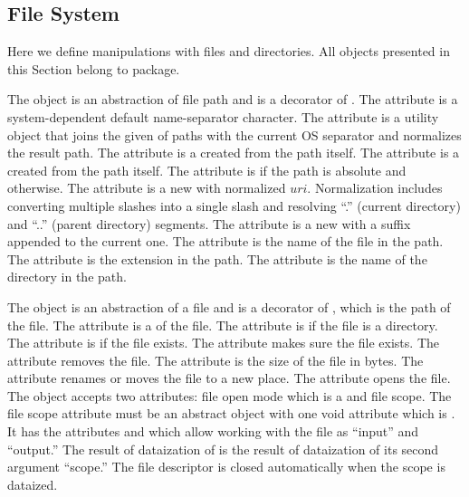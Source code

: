 
\subsection{File System}\label{sec:fs}

Here we define manipulations with files and directories.
All objects presented in this Section belong to  package.

The object  is an abstraction of file path and is a decorator of .
%
The attribute  is a system-dependent default name-separator character.
%
The attribute  is a utility object that joins the given 
  of paths with the current OS separator and normalizes the result path.
%
The attribute  is a  created from the path itself.
%
The attribute  is a  created from the path itself.
%
The attribute  is  if the path is absolute and  otherwise.
%
The attribute  is a new  with normalized \(uri\).
Normalization includes converting multiple slashes into a single slash
  and resolving ``.'' (current directory) and ``..'' (parent directory) segments.
%
The attribute  is a new  with a suffix appended to the current one.
%
The attribute  is the name of the file in the path.
%
The attribute  is the extension in the path.
%
The attribute  is the name of the directory in the path.

The object  is an abstraction of a file and is a decorator of ,
  which is the path of the file.
%
The attribute  is a  of the file.
%
The attribute  is  if the file is a directory.
%
The attribute  is  if the file exists.
%
The attribute  makes sure the file exists.
%
The attribute  removes the file.
%
The attribute  is the size of the file in bytes.
%
The attribute  renames or moves the file to a new place.
%
The attribute  opens the file.
The  object accepts two attributes: file open mode which is a 
  and file scope.
The file scope attribute must be an abstract object with one void attribute
  which is .
It has the attributes  and  which allow working with the file
  as ``input'' and ``output.''
The result of dataization of  is the result of dataization
  of its second argument ``scope.''
The file descriptor is closed automatically when the scope is dataized.

